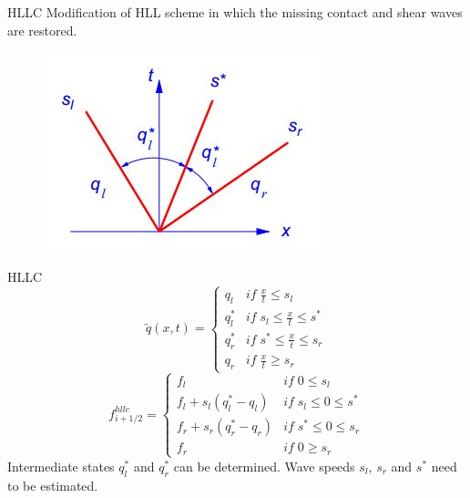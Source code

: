 \begin{frame}{HLLC}
	Modification of HLL scheme in which the missing contact and shear waves are restored.
	
\begin{figure}
\centering
\includegraphics[width=0.7\linewidth]{../../figs/hllc_fig}
\label{fig:hllc_fig}
\end{figure}
\end{frame}

\begin{frame}{HLLC}
	\begin{equation*}
	\tilde{q}(x,t) = \left\{ \begin{matrix} q_l & if \; \frac{x}{t} \leq s_l \\ q_l^{*} & if \;  s_l \leq \frac{x}{t} \leq s^{*} \\ q_r^{*} & if \; s^{*} \leq \frac{x}{t} \leq s_r \\ q_r & if \; \frac{x}{t} \geq s_r \end{matrix}\right.
	\end{equation*}
	\begin{equation*}
	f_{i+1/2}^{hllc} = \left\{ \begin{matrix} f_l & if \; 0 \leq s_l \\ f_l + s_l (q_l^{*}-q_l) & if \;  s_l \leq 0 \leq s^{*} \\ f_r + s_r (q_r^{*}-q_r) & if \; s^{*} \leq 0 \leq s_r \\ f_r & if \; 0 \geq s_r \end{matrix}\right.
	\end{equation*}
	Intermediate states $q_l^{*}$ and $q_r^{*}$ can be determined. \newline
	Wave speeds $s_l$, $s_r$ and $s^{*}$ need to be estimated.
\end{frame}



